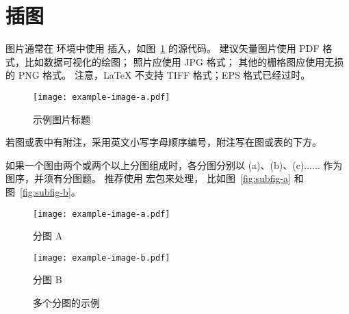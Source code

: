 
\setlength{\baselineskip}{20pt}

\section{插图} %

图片通常在  环境中使用  插入，如图~\ref{fig:example} 的源代码。
建议矢量图片使用 PDF 格式，比如数据可视化的绘图；
照片应使用 JPG 格式；
其他的栅格图应使用无损的 PNG 格式。
注意，LaTeX 不支持 TIFF 格式；EPS 格式已经过时。

\begin{figure}[htbp]
	\centering
	\texttt{[image: example-image-a.pdf]}
	\caption{示例图片标题} %
	\label{fig:example} %
\end{figure}

若图或表中有附注，采用英文小写字母顺序编号，附注写在图或表的下方。

如果一个图由两个或两个以上分图组成时，各分图分别以 (a)、(b)、(c)...... 作为图序，并须有分图题。
推荐使用  宏包来处理， 比如图~\ref{fig:subfig-a} 和图~\ref{fig:subfig-b}。

\begin{figure}[htbp]
	\centering
	\begin{minipage}{0.44\linewidth}
		\centering
		\texttt{[image: example-image-a.pdf]}
		\caption{分图 A}
		\label{fig:subfig-a}
	\end{minipage}
	\centering
	\begin{minipage}{0.44\linewidth}
		\centering
		\texttt{[image: example-image-b.pdf]}
		\caption{分图 B}
		\label{fig:subfig-b}
	\end{minipage}
	\caption{多个分图的示例}
	\label{fig:multi-image}
\end{figure}